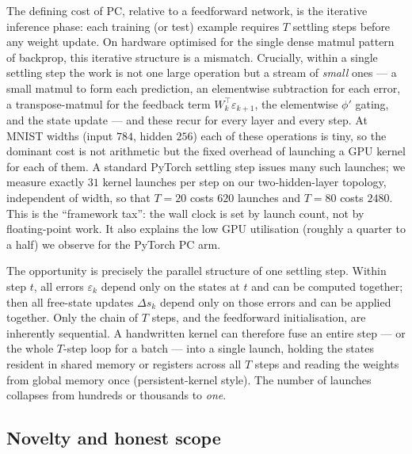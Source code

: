 The defining cost of PC, relative to a feedforward network, is the iterative inference phase: each
training (or test) example requires $T$ settling steps before any weight update. On hardware optimised
for the single dense matmul pattern of backprop, this iterative structure is a mismatch. Crucially,
within a single settling step the work is not one large operation but a stream of \emph{small} ones ---
a small matmul to form each prediction, an elementwise subtraction for each error, a transpose-matmul
for the feedback term $W_k^{\!\top}\varepsilon_{k+1}$, the elementwise $\phi'$ gating, and the state
update --- and these recur for every layer and every step. At MNIST widths (input $784$, hidden $256$)
each of these operations is tiny, so the dominant cost is not arithmetic but the fixed overhead of
launching a GPU kernel for each of them. A standard PyTorch settling step issues many such launches; we
measure exactly $31$ kernel launches per step on our two-hidden-layer topology, independent of width,
so that $T=20$ costs $620$ launches and $T=80$ costs $2480$. This is the ``framework tax'': the wall
clock is set by launch count, not by floating-point work. It also explains the low GPU utilisation
(roughly a quarter to a half) we observe for the PyTorch PC arm.

The opportunity is precisely the parallel structure of one settling step. Within step $t$, all errors
$\varepsilon_k$ depend only on the states at $t$ and can be computed together; then all free-state
updates $\Delta s_k$ depend only on those errors and can be applied together. Only the chain of $T$
steps, and the feedforward initialisation, are inherently sequential. A handwritten kernel can therefore
fuse an entire step --- or the whole $T$-step loop for a batch --- into a single launch, holding the
states resident in shared memory or registers across all $T$ steps and reading the weights from global
memory once (persistent-kernel style). The number of launches collapses from hundreds or thousands to
\emph{one}.

\subsection{Novelty and honest scope}


